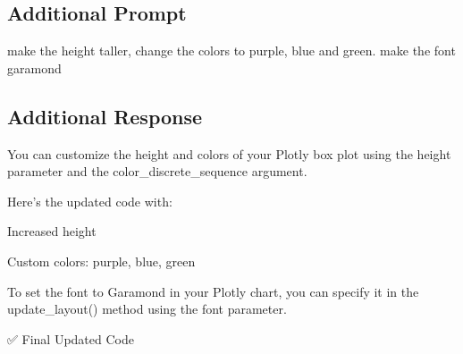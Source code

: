 \documentclass[
  letterpaper,
  DIV=11,
  numbers=noendperiod]{scrartcl}
\begin{document}
\subsection{Additional Prompt}\label{additional-prompt-1}

make the height taller, change the colors to purple, blue and green.
make the font garamond

\subsection{Additional Response}\label{additional-response-1}

You can customize the height and colors of your Plotly box plot using
the height parameter and the color\_discrete\_sequence argument.

Here's the updated code with:

Increased height

Custom colors: purple, blue, green

To set the font to Garamond in your Plotly chart, you can specify it in
the update\_layout() method using the font parameter.

✅ Final Updated Code
\end{document}
